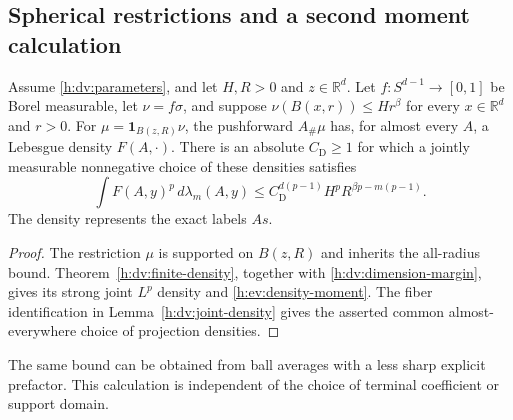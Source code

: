 \subsection{Spherical restrictions and a second moment calculation}

\begin{lemma}
\label{h:ev:density}
Assume \eqref{h:dv:parameters}, and let \(H,R>0\) and
\(z\in\mathbb R^d\).  Let \(f:S^{d-1}\to[0,1]\) be Borel
measurable, let \(\nu=f\sigma\), and suppose
\(\nu(B(x,r))\le H r^\beta\) for every \(x\in\mathbb R^d\) and \(r>0\).
For \(\mu=\mathbf 1_{B(z,R)}\nu\), the pushforward \(A_\#\mu\) has,
for almost every \(A\), a Lebesgue density \(F(A,\cdot)\).  There is
an absolute \(C_{\mathrm D}\ge1\) for which a jointly measurable
nonnegative choice of these densities satisfies
\begin{equation}\label{h:ev:density-moment}
 \int F(A,y)^p\,d\lambda_m(A,y)
 \le C_{\mathrm D}^{d(p-1)}
       H^pR^{\beta p-m(p-1)}.
\end{equation}
The density represents the exact labels \(As\).
\end{lemma}

\begin{proof}
The restriction \(\mu\) is supported on \(B(z,R)\) and inherits the
all-radius bound. Theorem~\ref{h:dv:finite-density}, together with
\eqref{h:dv:dimension-margin}, gives its strong joint \(L^p\) density
and \eqref{h:ev:density-moment}. The fiber identification in
Lemma~\ref{h:dv:joint-density} gives the asserted common almost-everywhere
choice of projection densities.
\end{proof}

The same bound can be obtained from ball averages with a less sharp
explicit prefactor. This calculation is independent of the choice of
terminal coefficient or support domain.


